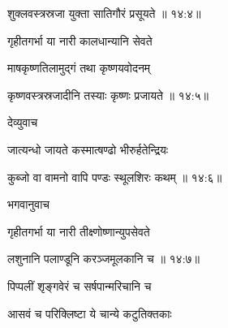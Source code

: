 
{\devanagarifont शुक्लवस्त्रस्रजा युक्ता सातिगौरं प्रसूयते {॥ १४:४॥} \veg\dontdisplaylinenum }%

{\devanagarifont गृहीतगर्भा या नारी कालधान्यानि सेवते \thinspace{\dandab} \dontdisplaylinenum }%

{\devanagarifont माषकृष्णतिलामुद्गं तथा कृष्णयवोदनम्  \danda\dontdisplaylinenum }%


{\devanagarifont कृष्णवस्त्रस्रजादीनि तस्याः कृष्णः प्रजायते {॥ १४:५॥} \veg\dontdisplaylinenum }%
 

{\devanagarifont देव्युवाच {\dandab}\dontdisplaylinenum  }%
 
{\devanagarifont जात्यन्धो जायते कस्मात्षण्ढो भीरुर्हतेन्द्रियः \thinspace{\danda} \dontdisplaylinenum }%
 

{\devanagarifont कुब्जो वा वामनो वापि पण्डः स्थूलशिरः कथम् {॥ १४:६॥} \veg\dontdisplaylinenum }%

{\devanagarifont भगवानुवाच {\dandab}\dontdisplaylinenum  }%
 
{\devanagarifont गृहीतगर्भा या नारी तीक्ष्णोष्णान्युपसेवते \thinspace{\danda} \dontdisplaylinenum }%
 

{\devanagarifont लशुनानि पलाण्डूनि करञ्जमूलकानि च {॥ १४:७॥} \veg\dontdisplaylinenum }%

{\devanagarifont पिप्पलीं शृङ्गवेरं च सर्षपान्मरिचानि च \thinspace{\dandab} \dontdisplaylinenum }%

{\devanagarifont आसवं च परिक्लिष्टा ये चान्ये कटुतिक्तकाः  \danda\dontdisplaylinenum }%

